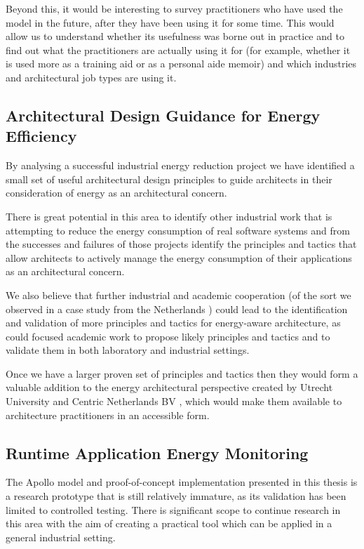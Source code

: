 Beyond this, it would be interesting to survey practitioners who have used the model in the future, after they have been using it for some time.  This would allow us to understand whether its usefulness was borne out in practice and to find out what the practitioners are actually using it for (for example, whether it is used more as a training aid or as a personal aide memoir) and which industries and architectural job types are using it.

\subsection{Architectural Design Guidance for Energy Efficiency}

By analysing a successful industrial energy reduction project we have identified a small set of useful architectural design principles to guide architects in their consideration of energy as an architectural concern.  

There is great potential in this area to identify other industrial work that is attempting to reduce the energy consumption of real software systems and from the successes and failures of those projects identify the principles and tactics that allow architects to actively manage the energy consumption of their applications as an architectural concern.  

We also believe that further industrial and academic cooperation (of the sort we observed in a case study from the Netherlands \cite{jagroep2016-comparingreleases}) could lead to the identification and validation of more principles and tactics for energy-aware architecture, as could focused academic work to propose likely principles and tactics and to validate them in both laboratory and industrial settings.

Once we have a larger proven set of principles and tactics then they would form a valuable addition to the energy architectural perspective created by Utrecht University and Centric Netherlands BV \cite{jagroep2017-energyperspective}, which would make them available to architecture practitioners in an accessible form.

\subsection{Runtime Application Energy Monitoring}

The Apollo model and proof-of-concept implementation presented in this thesis is a research prototype that is still relatively immature, as its validation has been limited to controlled testing.  There is significant scope to continue research in this area with the aim of creating a practical tool which can be applied in a general industrial setting.

